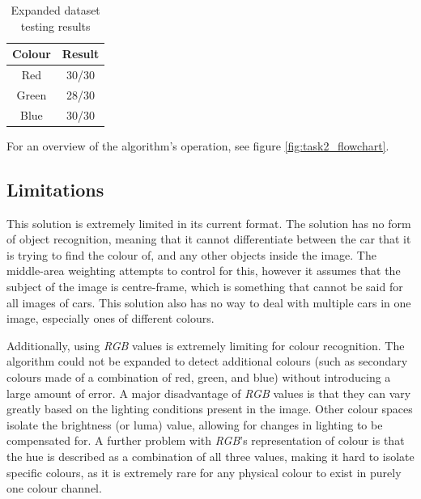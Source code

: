 \documentclass[conference]{IEEEtran}
\begin{document}
\begin{table}[H]
\caption{Expanded dataset testing results}
\label{testing_results1}
\centering
\begin{tabular}{|c||c|}
\hline
Colour & Result\\
\hline
Red & 30/30\\
\hline
Green & 28/30\\
\hline
Blue & 30/30\\
\hline
\end{tabular}
\end{table}

For an overview of the algorithm's operation, see figure \ref{fig:task2_flowchart}.


\subsection{Limitations}
This solution is extremely limited in its current format. The solution has no form of object recognition, meaning that it cannot differentiate between the car that it is trying to find the colour of, and any other objects inside the image. The middle-area weighting attempts to control for this, however it assumes that the subject of the image is centre-frame, which is something that cannot be said for all images of cars. This solution also has no way to deal with multiple cars in one image, especially ones of different colours. 

Additionally, using \textit{RGB} values is extremely limiting for colour recognition. The algorithm could not be expanded to detect additional colours (such as secondary colours made of a combination of red, green, and blue) without introducing a large amount of error. A major disadvantage of \textit{RGB} values is that they can vary greatly based on the lighting conditions present in the image. Other colour spaces isolate the brightness (or luma) value, allowing for changes in lighting to be compensated for. A further problem with \textit{RGB}'s representation of colour is that the hue is described as a combination of all three values, making it hard to isolate specific colours, as it is extremely rare for any physical colour to exist in purely one colour channel.
\end{document}
